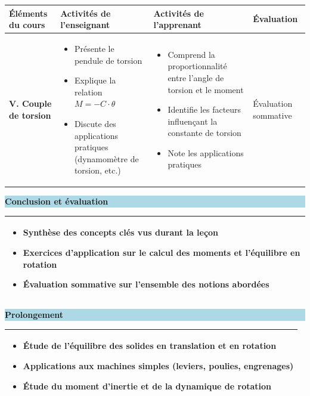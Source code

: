 \documentclass[12pt]{article}
\begin{document}
\begin{tabularx}{\textwidth}{|p{3.5cm}|X|X|p{2.5cm}|}
\hline
\rowcolor{lightgray}
\textbf{Éléments du cours} & \textbf{Activités de l'enseignant} & \textbf{Activités de l'apprenant} & \textbf{Évaluation} \\
\hline

\textbf{V. Couple de torsion} & 
\begin{itemize}[leftmargin=*]
\item Présente le pendule de torsion
\item Explique la relation $M = -C \cdot \theta$
\item Discute des applications pratiques (dynamomètre de torsion, etc.)
\end{itemize} & 
\begin{itemize}[leftmargin=*]
\item Comprend la proportionnalité entre l'angle de torsion et le moment
\item Identifie les facteurs influençant la constante de torsion
\item Note les applications pratiques
\end{itemize} & 
Évaluation sommative \\
\hline
\end{tabularx}

\vspace{1cm}

\begin{center}
\colorbox{lightblue}{\parbox{15cm}{\centering\textbf{Conclusion et évaluation}}}
\end{center}

\begin{tabular}{|p{16cm}|}
\hline
\begin{itemize}[leftmargin=*]
\item Synthèse des concepts clés vus durant la leçon
\item Exercices d'application sur le calcul des moments et l'équilibre en rotation
\item Évaluation sommative sur l'ensemble des notions abordées
\end{itemize} \\
\hline
\end{tabular}

\vspace{1cm}

\begin{center}
\colorbox{lightblue}{\parbox{15cm}{\centering\textbf{Prolongement}}}
\end{center}

\begin{tabular}{|p{16cm}|}
\hline
\begin{itemize}[leftmargin=*]
\item Étude de l'équilibre des solides en translation et en rotation
\item Applications aux machines simples (leviers, poulies, engrenages)
\item Étude du moment d'inertie et de la dynamique de rotation
\end{itemize} \\
\hline
\end{tabular}
\end{document}
